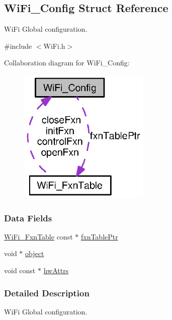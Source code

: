\subsection{Wi\+Fi\+\_\+\+Config Struct Reference}
\label{struct_wi_fi___config}


Wi\+Fi Global configuration.  




{\ttfamily \#include $<$Wi\+Fi.\+h$>$}



Collaboration diagram for Wi\+Fi\+\_\+\+Config\+:
\nopagebreak
\begin{figure}[H]
\begin{center}
\leavevmode
\includegraphics[width=177pt]{struct_wi_fi___config__coll__graph}
\end{center}
\end{figure}
\subsubsection*{Data Fields}
\begin{DoxyCompactItemize}
\item 
\hyperlink{struct_wi_fi___fxn_table}{Wi\+Fi\+\_\+\+Fxn\+Table} const $\ast$ \hyperlink{struct_wi_fi___config_a8cf499e237aab6a403419c8d44bff748}{fxn\+Table\+Ptr}
\item 
void $\ast$ \hyperlink{struct_wi_fi___config_a8e0dca8ae15856ee64627f5837abb744}{object}
\item 
void const $\ast$ \hyperlink{struct_wi_fi___config_a376ec48ac5e8e29ff93812758ec085cc}{hw\+Attrs}
\end{DoxyCompactItemize}


\subsubsection{Detailed Description}
Wi\+Fi Global configuration. 

